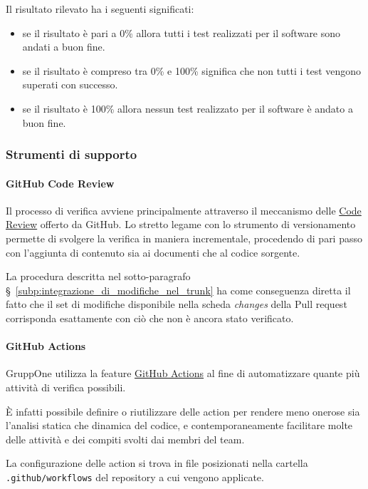 \documentclass[../../norme-di-progetto.tex]{subfiles}
\begin{document}
Il risultato rilevato ha i seguenti significati:
\begin{itemize}
  \item se il risultato è pari a 0\% allora tutti i test realizzati per il software sono andati a buon fine.
  \item se il risultato è compreso tra 0\% e 100\% significa che non tutti i test vengono superati con successo.
  \item se il risultato è 100\% allora nessun test realizzato per il software è andato a buon fine.
\end{itemize}




\subsubsection{Strumenti di supporto}%
\label{subs:verifica/strumenti}

\paragraph{GitHub Code Review}%
\label{par:code_review}

Il processo di verifica avviene principalmente attraverso il meccanismo delle \href{https://github.com/features/code-review/}{Code Review} offerto da GitHub.
Lo stretto legame con lo strumento di versionamento permette di svolgere la verifica in maniera incrementale, procedendo di pari passo con l'aggiunta di contenuto sia ai documenti che al codice sorgente.

La procedura descritta nel sotto-paragrafo §~\ref{subp:integrazione_di_modifiche_nel_trunk} ha come conseguenza diretta il fatto che il set di modifiche disponibile nella scheda \textit{changes} della Pull request corrisponda esattamente con ciò che non è ancora stato verificato.


\paragraph{GitHub Actions}%
\label{par:github_actions}

GruppOne utilizza la feature \href{https://help.github.com/en/actions/automating-your-workflow-with-github-actions/about-github-actions}{GitHub Actions} al fine di automatizzare quante più attività di verifica possibili.

È infatti possibile definire o riutilizzare delle action per rendere meno onerose sia l'analisi statica che dinamica del codice, e contemporaneamente facilitare molte delle attività e dei compiti svolti dai membri del team.

La configurazione delle action si trova in file  posizionati nella cartella \verb|.github/workflows| del repository a cui vengono applicate.


\end{document}
